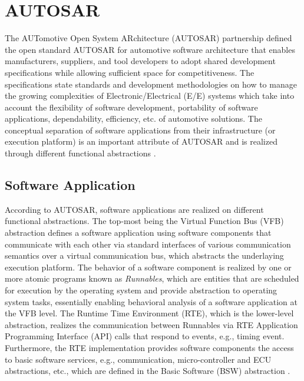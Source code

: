 \section{AUTOSAR}\label{sec_autosar}
The AUTomotive Open System ARchitecture (AUTOSAR) partnership defined the open standard AUTOSAR for automotive software architecture that enables manufacturers, suppliers, and tool developers to adopt shared development specifications while allowing sufficient space for competitiveness. The specifications state standards and development methodologies on how to manage the growing complexities of Electronic/Electrical (E/E) systems which take into account the flexibility of software development, portability of software applications, dependability, efficiency, etc. of automotive solutions. The conceptual separation of software applications from their infrastructure (or execution platform) is an important attribute of AUTOSAR and is realized through different functional abstractions \cite{NaumannAUTOSARBus}. 

\subsection{Software Application}
According to AUTOSAR, software applications are realized on different functional abstractions. The top-most being the Virtual Function Bus (VFB) abstraction defines a software application using software components that communicate with each other via standard interfaces of various communication semantics over a virtual communication bus, which abstracts the underlaying execution platform. The behavior of a software component is realized by one or more atomic programs known as \textit{Runnables}, which are entities that are scheduled for execution by the operating system and provide abstraction to operating system tasks, essentially enabling behavioral analysis of a software application at the VFB level. The Runtime Time Environment (RTE), which is the lower-level abstraction, realizes the communication between Runnables via RTE Application Programming Interface (API) calls that respond to events, e.g., timing event. Furthermore, the RTE implementation provides software components the access to basic software services, e.g., communication, micro-controller and ECU abstractions, etc., which are defined in the Basic Software (BSW) abstraction \cite{NaumannAUTOSARBus}. 

